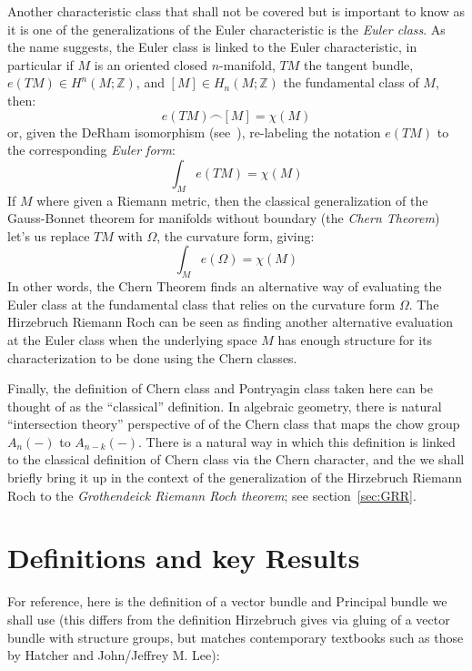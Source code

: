 \documentclass{book}
\newcommand{\Z}{{\mathbb{Z}}}
\begin{document}
Another characteristic class that shall not be covered but is important to know as it is one of the
generalizations of the Euler characteristic is the \emph{Euler class}. As
the name suggests, the Euler class is linked to the Euler characteristic, in particular if $M$ is an oriented
closed $n$-manifold, $TM$ the tangent bundle, $e(TM) \in H^n(M; \Z)$, and $[M] \in H_n(M; \Z)$ the fundamental class of $M$, then:
\[
  e(TM) \frown [M] = \chi(M)
\]
or, given the DeRham isomorphism (see~\cite{NateDiffGeo}), re-labeling the notation $e(TM)$ to the corresponding \emph{Euler form}:
\[
  \int_M e(TM) = \chi(M)
\]
If $M$ where given a Riemann metric, then the classical generalization of the Gauss-Bonnet theorem for
manifolds without boundary (the \emph{Chern Theorem}) let's us replace $TM$ with $\Omega$, the curvature form,
giving:
\[
  \int_M e(\Omega) = \chi(M)
\]
In other words, the Chern Theorem finds an alternative way of evaluating the Euler class at the fundamental
class that relies on the curvature form $\Omega$. The Hirzebruch Riemann Roch can be seen as
finding another alternative evaluation at the Euler class when the underlying space $M$ has enough structure for
its characterization to be done using the Chern classes.

Finally, the definition of Chern class and Pontryagin class taken here can be thought of as the ``classical''
definition. In algebraic geometry, there is natural ``intersection theory'' perspective of of the Chern class
that maps the chow group $A_n(-)$ to $A_{n-k}(-)$. There is a natural way in which this definition is linked
to the classical definition of Chern class via the Chern character, and the we shall briefly bring it up in the context of the generalization of the
Hirzebruch Riemann Roch to the \emph{Grothendeick Riemann Roch theorem}; see section~\ref{sec:GRR}.

\section{Definitions and key Results}

For reference, here is the definition of a vector bundle and Principal bundle we shall use (this differs from
the definition Hirzebruch gives via gluing of a vector bundle with structure groups, but matches contemporary
textbooks such as those by Hatcher and John/Jeffrey M. Lee):
\end{document}
